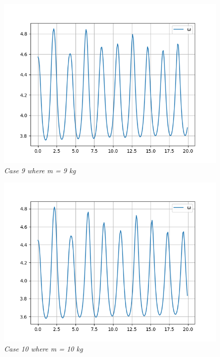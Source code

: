         \begin{figure}[H]
            \centering
            \includegraphics{Appendix/RExpPictures/AF/afm9.png}
            \caption{\textit{Case 9 where m = 9 kg}}
            \label{}
        \end{figure}
            
        \begin{figure}[H]
            \centering
            \includegraphics{Appendix/RExpPictures/AF/afm10.png}
            \caption{\textit{Case 10 where m = 10 kg}}
            \label{}
        \end{figure}
            
            
   






